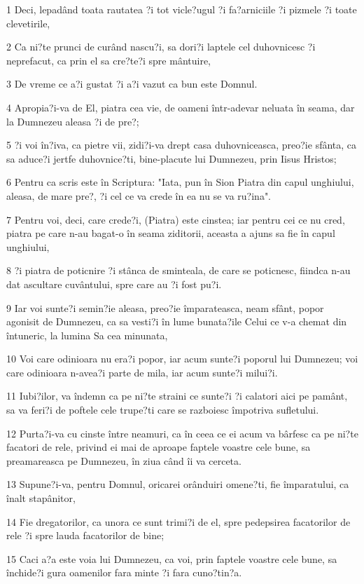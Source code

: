 \par 1 Deci, lepadând toata rautatea ?i tot vicle?ugul ?i fa?arniciile ?i pizmele ?i toate clevetirile,
\par 2 Ca ni?te prunci de curând nascu?i, sa dori?i laptele cel duhovnicesc ?i neprefacut, ca prin el sa cre?te?i spre mântuire,
\par 3 De vreme ce a?i gustat ?i a?i vazut ca bun este Domnul.
\par 4 Apropia?i-va de El, piatra cea vie, de oameni într-adevar neluata în seama, dar la Dumnezeu aleasa ?i de pre?;
\par 5 ?i voi în?iva, ca pietre vii, zidi?i-va drept casa duhovniceasca, preo?ie sfânta, ca sa aduce?i jertfe duhovnice?ti, bine-placute lui Dumnezeu, prin Iisus Hristos;
\par 6 Pentru ca scris este în Scriptura: "Iata, pun în Sion Piatra din capul unghiului, aleasa, de mare pre?, ?i cel ce va crede în ea nu se va ru?ina".
\par 7 Pentru voi, deci, care crede?i, (Piatra) este cinstea; iar pentru cei ce nu cred, piatra pe care n-au bagat-o în seama ziditorii, aceasta a ajuns sa fie în capul unghiului,
\par 8 ?i piatra de poticnire ?i stânca de sminteala, de care se poticnesc, fiindca n-au dat ascultare cuvântului, spre care au ?i fost pu?i.
\par 9 Iar voi sunte?i semin?ie aleasa, preo?ie împarateasca, neam sfânt, popor agonisit de Dumnezeu, ca sa vesti?i în lume bunata?ile Celui ce v-a chemat din întuneric, la lumina Sa cea minunata,
\par 10 Voi care odinioara nu era?i popor, iar acum sunte?i poporul lui Dumnezeu; voi care odinioara n-avea?i parte de mila, iar acum sunte?i milui?i.
\par 11 Iubi?ilor, va îndemn ca pe ni?te straini ce sunte?i ?i calatori aici pe pamânt, sa va feri?i de poftele cele trupe?ti care se razboiesc împotriva sufletului.
\par 12 Purta?i-va cu cinste între neamuri, ca în ceea ce ei acum va bârfesc ca pe ni?te facatori de rele, privind ei mai de aproape faptele voastre cele bune, sa preamareasca pe Dumnezeu, în ziua când îi va cerceta.
\par 13 Supune?i-va, pentru Domnul, oricarei orânduiri omene?ti, fie împaratului, ca înalt stapânitor,
\par 14 Fie dregatorilor, ca unora ce sunt trimi?i de el, spre pedepsirea facatorilor de rele ?i spre lauda facatorilor de bine;
\par 15 Caci a?a este voia lui Dumnezeu, ca voi, prin faptele voastre cele bune, sa închide?i gura oamenilor fara minte ?i fara cuno?tin?a.
